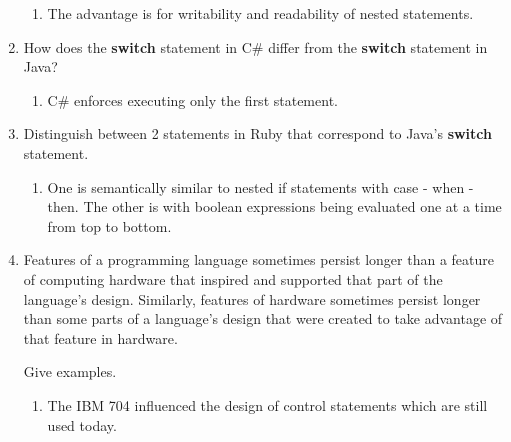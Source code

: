 \begin{enumerate}
    \begin{answer}

    \begin{enumerate}
    \item The advantage is for writability and readability of nested statements.
    \end{enumerate}

    \end{answer}
  
  \item How does the \textbf{switch} statement in C\#
    differ from the \textbf{switch} statement in Java?

      \begin{answer}

    \begin{enumerate}
    \item C\# enforces executing only the first statement.
    \end{enumerate}

    \end{answer}

  \item Distinguish between 2 statements in Ruby
    that correspond to Java's \textbf{switch} statement.

      \begin{answer}

    \begin{enumerate}
    \item One is semantically similar to nested if statements with
      case - when - then.  The other is with boolean expressions being
      evaluated one at a time from top to bottom.
    \end{enumerate}

    \end{answer}

  \item Features of a programming language sometimes persist
    longer than a feature of computing hardware that inspired
    and supported that part of the language's design.
    Similarly, features of hardware sometimes persist longer
    than some parts of a language's design that were created
    to take advantage of that feature in hardware.

    Give examples.

    \begin{answer}
    \begin{enumerate}
    \item The IBM 704 influenced the design of control statements
      which are still used today.
    \end{enumerate}


\end{answer}
\end{enumerate}
